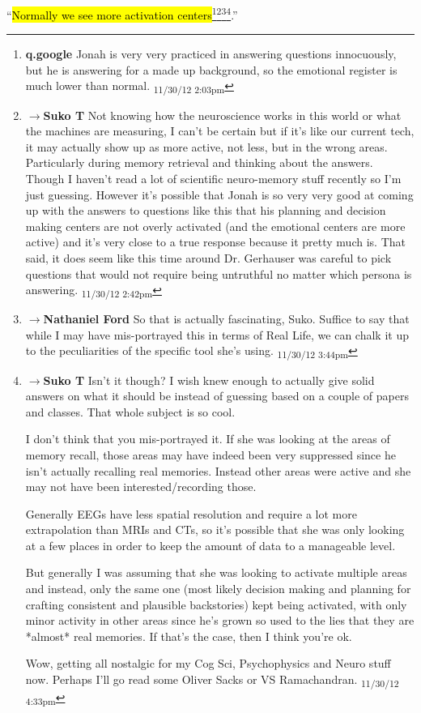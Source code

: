 ``\hl{Normally we see more activation centers}\footnote{\textbf{q.google }Jonah is very very practiced in answering questions innocuously, but he is answering for a made up background, so the emotional register is much lower than normal. \textsubscript{11/30/12 2:03pm}}\footnote{$\rightarrow$\textbf{Suko T }Not knowing how the neuroscience works in this world or what the machines are measuring, I can't be certain but if it's like our current tech, it may actually show up as more active, not less, but in the wrong areas.  Particularly during memory retrieval and thinking about the answers.  Though I haven't read a lot of scientific neuro-memory stuff recently so I'm just guessing.  However it's possible that Jonah is so very very good at coming up with the answers to questions like this that his planning and decision making centers are not overly activated (and the emotional centers are more active) and it's very close to a true response because it pretty much is.  That said, it does seem like this time around Dr. Gerhauser was careful to pick questions that would not require being untruthful no matter which persona is answering. \textsubscript{11/30/12 2:42pm}}\footnote{$\rightarrow$\textbf{Nathaniel Ford }So that is actually fascinating, Suko. Suffice to say that while I may have mis-portrayed this in terms of Real Life, we can chalk it up to the peculiarities of the specific tool she's using. \textsubscript{11/30/12 3:44pm}}\footnote{$\rightarrow$\textbf{Suko T }Isn't it though?  I wish knew enough to actually give solid answers on what it should be instead of guessing based on a couple of papers and classes. That whole subject is so cool.  

I don't think that you mis-portrayed it.  If she was looking at the areas of memory recall, those areas may have indeed been very suppressed since he isn't actually recalling real memories.  Instead other areas were active and she may not have been interested/recording those.  

Generally EEGs have less spatial resolution and require a lot more extrapolation than MRIs and CTs, so it's possible that she was only looking at a few places in order to keep the amount of data to a manageable level.

But generally I was assuming that she was looking to activate multiple areas and instead, only the same one (most likely decision making and planning for crafting consistent and plausible backstories) kept being activated, with only minor activity in other areas since he's grown so used to the lies that they are *almost* real memories.  If that's the case, then I think you're ok.

Wow, getting all nostalgic for my Cog Sci, Psychophysics and Neuro stuff now.  Perhaps I'll go read some Oliver Sacks or VS Ramachandran. \textsubscript{11/30/12 4:33pm}}.''

